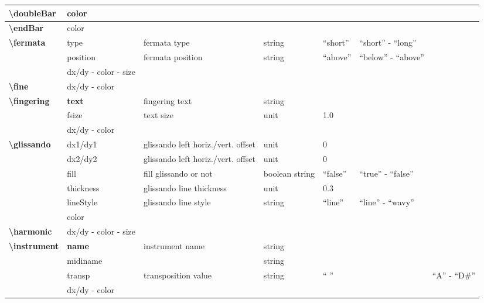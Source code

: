 \documentclass[a4paper, landscape, 10pt]{article}
\begin{document}
\begin{tabularx}{\linewidth}{p{3cm}p{3cm}p{5cm}p{3cm}p{2.5cm}p{3.5cm}p{4cm}}
    \hline
    \textbf{\textbackslash{}doubleBar}&color&&&&&\\
    \hline
    \textbf{\textbackslash{}endBar}&color&&&&&\\
    \hline
    \textbf{\textbackslash{}fermata}&type&fermata type&string&``short''&``short'' - ``long''&\\
    &position&fermata position&string&``above''&``below'' - ``above''&\\
    &dx/dy - color - size&&&&&\\
    \hline
    \textbf{\textbackslash{}fine}&dx/dy - color&&&&&\\
    \hline
    \textbf{\textbackslash{}fingering}&\textbf{text}&fingering text&string&&&\\
    &fsize&text size&unit&1.0&&\\
    &dx/dy - color&&&&&\\
    \hline
    \textbf{\textbackslash{}glissando}&dx1/dy1&glissando left horiz./vert. offset&unit&0&&\\
    &dx2/dy2&glissando left horiz./vert. offset&unit&0&&\\
    &fill&fill glissando or not&boolean string&``false''&``true'' - ``false''&\\
    &thickness&glissando line thickness&unit&0.3&&\\
    &lineStyle&glissando line style&string&``line''&``line'' - ``wavy''&\\ %
    &color&&&&&\\
    \hline
	\textbf{\textbackslash{}harmonic}&dx/dy - color - size&&&&&\\
	\hline
    \textbf{\textbackslash{}instrument}&\textbf{name}&instrument name&string&&&\\
    &midiname&&string&&&\\ %
    &transp&transposition value&string&`` ''&&``A'' - ``D\#''\\
    &dx/dy - color&&&&&\\
    \hline
\end{tabularx}
\end{document}
